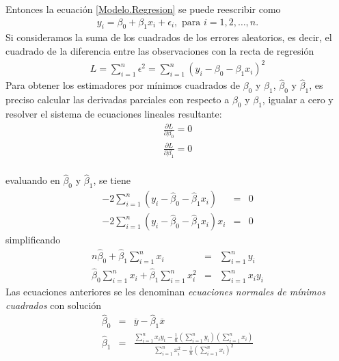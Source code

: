 Entonces la ecuaci\'on \ref{Modelo.Regresion} se puede reescribir como
\begin{eqnarray}\label{Modelo.Regresion.dos}
y_{i}=\beta_{0}+\beta_{1}x_{i}+\epsilon_{i},\textrm{ para }i=1,2,\ldots,n.
\end{eqnarray}
Si consideramos la suma de los cuadrados de los errores aleatorios, es decir, el cuadrado de la diferencia entre las observaciones con la recta de regresi\'on
\begin{eqnarray}
L=\sum_{i=1}^{n}\epsilon^{2}=\sum_{i=1}^{n}\left(y_{i}-\beta_{0}-\beta_{1}x_{i}\right)^{2}
\end{eqnarray}
Para obtener los estimadores por m\'inimos cuadrados de $\beta_{0}$ y $\beta_{1}$, $\hat{\beta}_{0}$ y $\hat{\beta}_{1}$, es preciso calcular las derivadas parciales con respecto a $\beta_{0}$ y $\beta_{1}$, igualar a cero y resolver el sistema de ecuaciones lineales resultante:
\begin{eqnarray*}
\frac{\partial L}{\partial \beta_{0}}=0\\
\frac{\partial L}{\partial \beta_{1}}=0\\
\end{eqnarray*}





evaluando en $\hat{\beta}_{0}$ y $\hat{\beta}_{1}$, se tiene
\begin{eqnarray*}
-2\sum_{i=1}^{n}\left(y_{i}-\hat{\beta}_{0}-\hat{\beta}_{1}x_{i}\right)&=&0\\
-2\sum_{i=1}^{n}\left(y_{i}-\hat{\beta}_{0}-\hat{\beta}_{1}x_{i}\right)x_{i}&=&0
\end{eqnarray*}
simplificando
\begin{eqnarray*}
n\hat{\beta}_{0}+\hat{\beta}_{1}\sum_{i=1}^{n}x_{i}&=&\sum_{i=1}^{n}y_{i}\\
\hat{\beta}_{0}\sum_{i=1}^{n}x_{i}+\hat{\beta}_{1}\sum_{i=1}^{n}x_{i}^{2}&=&\sum_{i=1}^{n}x_{i}y_{i}
\end{eqnarray*}
Las ecuaciones anteriores se les denominan \textit{ecuaciones normales de m\'inimos cuadrados} con soluci\'on
\begin{eqnarray}\label{Ecs.Estimadores.Regresion}
\hat{\beta}_{0}&=&\overline{y}-\hat{\beta}_{1}\overline{x}\\
\hat{\beta}_{1}&=&\frac{\sum_{i=1}^{n}x_{i}y_{i}-\frac{1}{n}\left(\sum_{i=1}^{n}y_{i}\right)\left(\sum_{i=1}^{n}x_{i}\right)}{\sum_{i=1}^{n}x_{i}^{2}-\frac{1}{n}\left(\sum_{i=1}^{n}x_{i}\right)^{2}}
\end{eqnarray}





